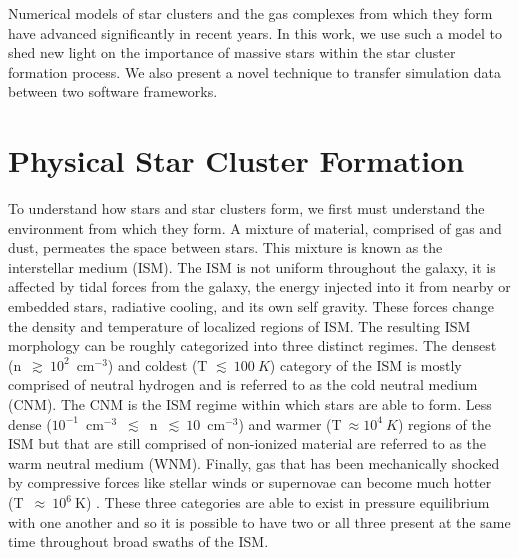 \documentclass[twoside]{drexel-thesis}
\begin{document}
\begin{thesis}
Numerical models of star clusters and the gas complexes from which they form have advanced significantly in recent years. In this work, we use such a model to shed new light on the importance of massive stars within the star cluster formation process. We also present a novel technique to transfer simulation data between two software frameworks. 


\section{Physical Star Cluster Formation}

To understand how stars and star clusters form, we first must understand the environment from which they form. A mixture of material, comprised of gas and dust, permeates the space between stars. This mixture is known as the interstellar medium (ISM). The ISM is not uniform throughout the galaxy, it is affected by tidal forces from the galaxy, the energy injected into it from nearby or embedded stars, radiative cooling, and its own self gravity. These forces change the density and temperature of localized regions of ISM. The resulting ISM morphology can be roughly categorized into three distinct regimes. The densest (n~$\gtrsim~10^{2}$~cm$^{-3}$) and coldest (T $\lesssim~100~K$) category of the ISM is mostly comprised of neutral hydrogen and is referred to as the cold neutral medium (CNM). The CNM is the ISM regime within which stars are able to form. Less dense ($10^{-1}$~cm$^{-3}$~$\lesssim$~n~$\lesssim~10$~cm$^{-3}$) and warmer (T$~\approx{10^{4}~K}$) regions of the ISM but that are still comprised of non-ionized material are referred to as the warm neutral medium (WNM). Finally, gas that has been mechanically shocked by compressive forces like stellar winds or supernovae can become much hotter (T~$\approx~10^{6}~$K) \citep{draine_2011}. These three categories are able to exist in pressure equilibrium with one another and so it is possible to have two or all three present at the same time throughout broad swaths of the ISM.


\end{thesis}
\end{document}
